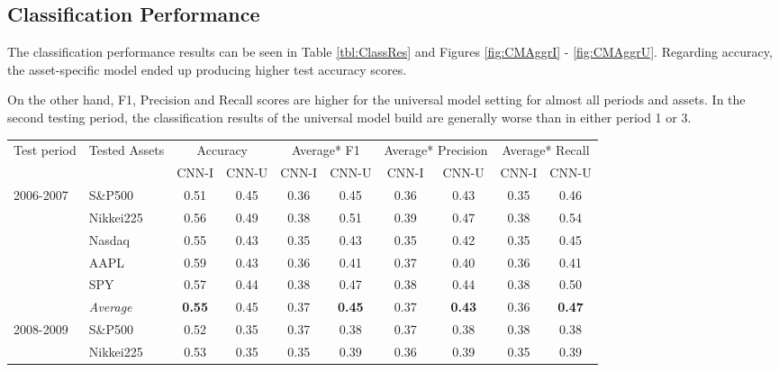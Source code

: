 \documentclass[11pt, a4paper]{article}
\begin{document}
\subsection{Classification Performance}
\label{subsec:ER:ClassPerf}

The classification performance results can be seen in Table \ref{tbl:ClassRes} and Figures \ref{fig:CMAggrI} - \ref{fig:CMAggrU}.
Regarding accuracy, the asset-specific model ended up producing higher test accuracy scores. 

On the other hand, F1, Precision and Recall scores are higher for the universal model setting for almost all periods and assets. In the second testing period, the classification results of the universal model build are generally worse than in either period 1 or 3.

\begin{table}[H]
\begin{tabular}{l|l|cc|cc|cc|cc}
\multicolumn{1}{m{1cm}|}{\multirow{2}{1cm}{Test period}} & \multicolumn{1}{m{1.5cm}|}{\multirow{2}{1.5cm}{Tested Assets}} & \multicolumn{2}{c|}{Accuracy} & \multicolumn{2}{c|}{Average* F1} & \multicolumn{2}{c|}{Average* Precision} & \multicolumn{2}{c}{Average* Recall}  \\
\cline{3-10}
&& CNN-I & CNN-U & CNN-I & CNN-U & CNN-I & CNN-U & CNN-I & CNN-U \\ \hline \hline
\multirow{6}{1cm}{2006-2007} & S\&P500          & 0.51          & 0.45 & 0.36 & 0.45          & 0.36 & 0.43          & 0.35 & 0.46          \\
& Nikkei225        & 0.56          & 0.49 & 0.38 & 0.51          & 0.39 & 0.47          & 0.38 & 0.54          \\
& Nasdaq           & 0.55          & 0.43 & 0.35 & 0.43          & 0.35 & 0.42          & 0.35 & 0.45          \\
& AAPL             & 0.59          & 0.43 & 0.36 & 0.41          & 0.37 & 0.40          & 0.36 & 0.41          \\
& SPY              & 0.57          & 0.44 & 0.38 & 0.47          & 0.38 & 0.44          & 0.38 & 0.50          \\ \cline{2-10}
& \textit{Average} & \textbf{0.55} & 0.45 & 0.37 & \textbf{0.45} & 0.37 & \textbf{0.43} & 0.36 & \textbf{0.47} \\ \hline
\multirow{6}{1cm}{2008-2009} & S\&P500          & 0.52          & 0.35 & 0.37 & 0.38          & 0.37 & 0.38          & 0.38 & 0.38          \\
          & Nikkei225        & 0.53          & 0.35 & 0.35 & 0.39          & 0.36 & 0.39          & 0.35 & 0.39          \\

\end{tabular}
\end{table}
\end{document}

